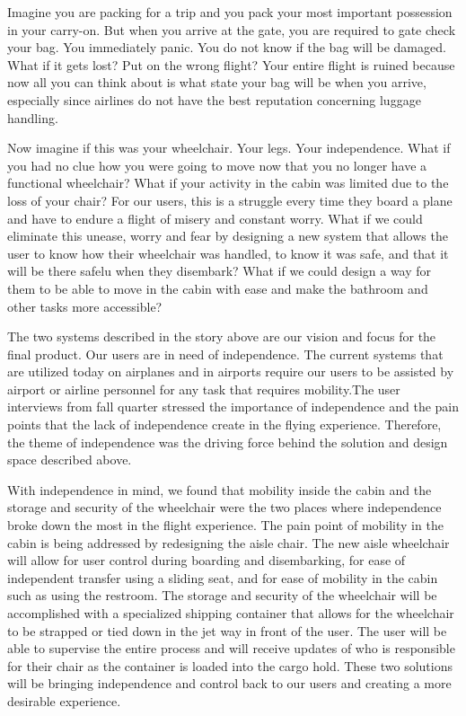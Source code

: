 Imagine you are packing for a trip and you pack your most important possession in your carry-on.   But when you arrive at the gate, you are required to gate check your bag.  You immediately panic. You do not know if the bag will be damaged. What if it gets lost? Put on the wrong flight? Your entire flight is ruined because now all you can think about is what state your bag will be when you arrive, especially since airlines do not have the best reputation concerning luggage handling. 

Now imagine if this was your wheelchair.  Your legs. Your independence. What if you had no clue how you were going to move now that you no longer have a functional wheelchair? What if your activity in the cabin was limited due to the loss of your chair?  For our users, this is a struggle every time they board a plane and have to endure a flight of misery and constant worry.  What if we could eliminate this unease, worry and fear by designing a new system that allows the user to know how their wheelchair was handled, to know it was safe, and that it will be there safelu when they disembark?  What if we could design a way for them to be able to move in the cabin with ease and make the bathroom and other tasks more accessible? 

The two systems described in the story above are our vision and focus for the final product. Our users are in need of independence.  The current systems that are utilized today on airplanes and in airports require our users to be assisted by airport or airline personnel for any task that requires mobility.The user interviews from fall quarter stressed the importance of independence and the pain points that the lack of independence create in the flying experience.  Therefore, the theme of independence was the driving force behind the solution and design space described above. 

 With independence in mind, we found that mobility inside the cabin and the storage and security of the wheelchair were the two places where independence broke down the most in the flight experience. The pain point of mobility in the cabin is being addressed by redesigning the aisle chair.  The new aisle wheelchair will allow for user control during boarding and disembarking, for ease of independent transfer using a sliding seat, and for ease of mobility in the cabin such as using the restroom. The storage and security of the wheelchair will be accomplished with a specialized shipping container that allows for the wheelchair to be strapped or tied down in the jet way in front of the user. The user will be able to supervise the entire process and will receive updates of who is responsible for their chair as the container is loaded into the cargo hold.  These two solutions will be bringing independence and control back to our users and creating a more desirable experience. 

